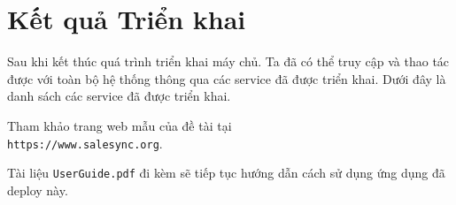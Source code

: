 \chapter{Kết quả Triển khai}
\label{Chapter4}
Sau khi kết thúc quá trình triển khai máy chủ. Ta đã có thể truy cập và thao tác được với toàn bộ hệ thống thông qua các service đã được triển khai. Dưới đây là danh sách các service đã được triển khai.

Tham khảo trang web mẫu của đề tài tại \\
\texttt{https://www.salesync.org}.

Tài liệu \texttt{UserGuide.pdf} đi kèm sẽ tiếp tục hướng dẫn cách sử dụng ứng dụng đã deploy này.

